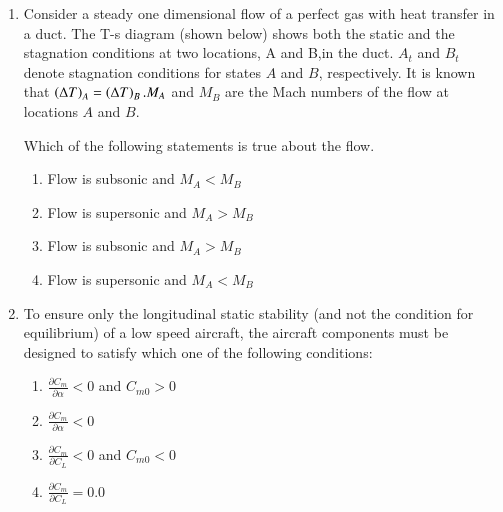 \documentclass[journal,12pt,onecolumn]{IEEEtran}
\theoremstyle{remark}
\begin{document}
\begin{enumerate}[start=1]
\item Consider a steady one dimensional flow of a perfect gas with heat transfer in a duct. The T-s diagram (shown below) shows both the static and the stagnation conditions at two locations, A and B,in the duct. $A_t$ and $B_t$ denote stagnation conditions for states $A$ and $B$, respectively. It is known that $\left(\Delta T\right)_A=\left(\Delta T\right)_B. M_A$ and $M_B$ are the Mach numbers of the flow at locations $A$ and $B$.\\
	\begin{center}
\end{center}
Which of the following statements is true about the flow.
\begin{enumerate}
	\item Flow is subsonic and $M_A<M_B$
	\item Flow is supersonic and $M_A>M_B$
	\item Flow is subsonic and $M_A>M_B$
	\item Flow is supersonic and $M_A<M_B$
\end{enumerate}

\item To ensure only the longitudinal static stability (and not the condition for equilibrium) of a low speed aircraft, the aircraft components must be designed to satisfy which one of the following conditions:
	\begin{enumerate}
		\item $\frac{\partial C_m}{\partial \alpha}<0$ and $C_{m0}>0$
		\item $\frac{\partial C_m}{\partial \alpha}<0$ 
		\item $\frac{\partial C_m}{\partial {C_L}}<0$ and $C_{m0}<0$
		\item $\frac{\partial C_m}{\partial {C_L}}=0.0$
	\end{enumerate}


\end{enumerate}
\end{document}
